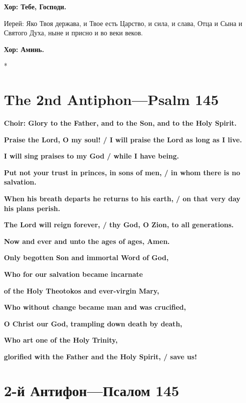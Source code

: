 \documentclass[12pt,a4paper,titlepage]{report}
\begin{document}
\begin{paracol}[1]{2}
  \textbf{Хор: Тебе, Господи.}

  Иерей: Яко Твоя держава, и Твое есть Царство, и сила, и слава, Отца и Сына и Святого Духа, ныне и присно и во веки веков.

  \textbf{Хор: Аминь.}

  \switchcolumn[0]*

  \section*{The 2nd Antiphon---Psalm 145}
  \textbf{Choir: Glory to the Father, and to the Son, and to the Holy Spirit.}
  \medskip

  \textbf{Praise the Lord, O my soul! / I will praise the Lord as long as I live.}

  \textbf{I will sing praises to my God / while I have being.}

  \textbf{Put not your trust in princes, in sons of men, / in whom there is no salvation.}

  \textbf{When his breath departs he returns to his earth, / on that very day his plans perish.}

  \textbf{The Lord will reign forever, / thy God, O Zion, to all generations.}

  \medskip
  \textbf{Now and ever and unto the ages of ages, Amen.}
  \medskip

  \textbf{Only begotten Son and immortal Word of God,}

  \textbf{Who for our salvation became incarnate}

  \textbf{of the Holy Theotokos and ever-virgin Mary,}

  \textbf{Who without change became man and was crucified,}

  \textbf{O Christ our God, trampling down death by death,}

  \textbf{Who art one of the Holy Trinity,}

  \textbf{glorified with the Father and the Holy Spirit, / save us!}

  \switchcolumn[1]

  \section*{2-й Антифон---Псалом 145}


\end{paracol}
\end{document}
